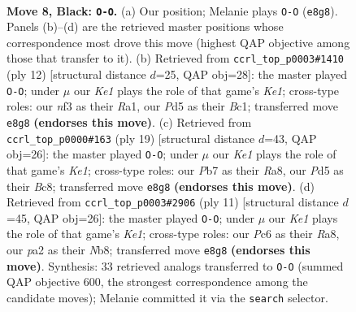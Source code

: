 \documentclass[11pt]{article}
\begin{document}
\begin{figure}[p]\centering
\begin{subfigure}{0.46\textwidth}\centering
\resizebox{\linewidth}{!}{%
\newchessgame
\chessboard[
  setfen={rnbqk2r/pp4pp/2pb1n2/3p1p2/3P3P/5NP1/PP2PPB1/RNBQ1RK1 b kq - 0 8},
  showmover=false,
  pgfstyle=straightmove, color=movearrow, markmove={e8-g8}
]}
\caption{}
\end{subfigure}\hfill
\begin{subfigure}{0.46\textwidth}\centering
\resizebox{\linewidth}{!}{%
\newchessgame
\chessboard[
  setfen={rnbqk2r/pp2ppbp/5np1/3p4/3P4/2PB1N2/PP3PPP/RNBQK2R w KQkq - 1 7},
  showmover=false,
  pgfstyle=straightmove, color=movearrow, markmove={e1-g1}
]}
\caption{}
\end{subfigure}
\\[4pt]
\begin{subfigure}{0.46\textwidth}\centering
\resizebox{\linewidth}{!}{%
\newchessgame
\chessboard[
  setfen={r1bqk2r/pp3ppp/2nbpn2/8/3P4/5NP1/PP2QPBP/RNB2RK1 b kq - 2 10},
  showmover=false,
  pgfstyle=straightmove, color=movearrow, markmove={e8-g8}
]}
\caption{}
\end{subfigure}\hfill
\begin{subfigure}{0.46\textwidth}\centering
\resizebox{\linewidth}{!}{%
\newchessgame
\chessboard[
  setfen={rnbqk2r/ppp2ppp/3b1n2/3p4/3P4/3B1N2/PPP2PPP/RNBQ1RK1 b kq - 5 6},
  showmover=false,
  pgfstyle=straightmove, color=movearrow, markmove={e8-g8}
]}
\caption{}
\end{subfigure}
\caption{\textbf{Move 8, Black: \texttt{O-O}.} (a) Our position; Melanie plays \texttt{O-O} (\texttt{e8g8}). Panels (b)--(d) are the retrieved master positions whose correspondence most drove this move (highest QAP objective among those that transfer to it). (b) Retrieved from \texttt{ccrl\_top\_p0003\#1410} (ply 12) [structural distance $d$=25, QAP obj=28]: the master played \texttt{O-O}; under $\mu$ our \emph{Ke1} plays the role of that game's \emph{Ke1}; cross-type roles: our \emph{n}f3 as their \emph{R}a1, our \emph{P}d5 as their \emph{B}c1; transferred move \texttt{e8g8} \textbf{(endorses this move)}. (c) Retrieved from \texttt{ccrl\_top\_p0000\#163} (ply 19) [structural distance $d$=43, QAP obj=26]: the master played \texttt{O-O}; under $\mu$ our \emph{Ke1} plays the role of that game's \emph{Ke1}; cross-type roles: our \emph{P}b7 as their \emph{R}a8, our \emph{P}d5 as their \emph{B}c8; transferred move \texttt{e8g8} \textbf{(endorses this move)}. (d) Retrieved from \texttt{ccrl\_top\_p0003\#2906} (ply 11) [structural distance $d$=45, QAP obj=26]: the master played \texttt{O-O}; under $\mu$ our \emph{Ke1} plays the role of that game's \emph{Ke1}; cross-type roles: our \emph{P}c6 as their \emph{R}a8, our \emph{p}a2 as their \emph{N}b8; transferred move \texttt{e8g8} \textbf{(endorses this move)}. Synthesis: 33 retrieved analogs transferred to \texttt{O-O} (summed QAP objective 600, the strongest correspondence among the candidate moves); Melanie committed it via the \texttt{search} selector.}
\label{fig:thought-m15}
\end{figure}
\end{document}
